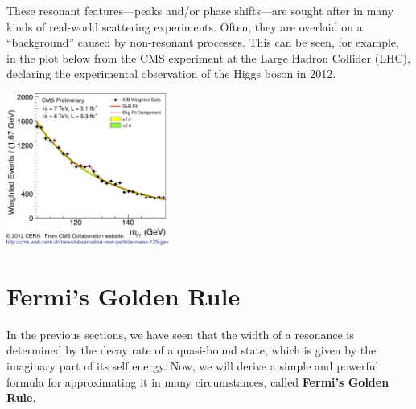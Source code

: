 \documentclass[prx,12pt]{revtex4-2}
\begin{document}
These resonant features---peaks and/or phase shifts---are sought after
in many kinds of real-world scattering experiments.  Often, they are
overlaid on a ``background'' caused by non-resonant processes.  This
can be seen, for example, in the plot below from the CMS experiment at
the Large Hadron Collider (LHC), declaring the experimental
observation of the Higgs boson in 2012.

\begin{center}
  \includegraphics[width=0.4\textwidth]{higgs}
\end{center}

\section{Fermi's Golden Rule}
\label{sec:goldenrule}

In the previous sections, we have seen that the width of a resonance
is determined by the decay rate of a quasi-bound state, which is given
by the imaginary part of its self energy.  Now, we will derive a
simple and powerful formula for approximating it in many
circumstances, called \textbf{Fermi's Golden Rule}.
\end{document}
